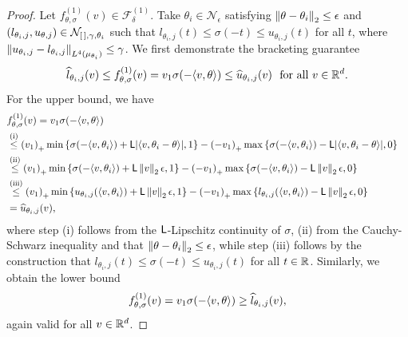 \begin{proof}
	Let $f_{\theta, \sigma}^{(1)}(v) \in \mathcal{F}_\delta^{(1)}$.
	Take $\theta_i \in \mathcal{N}_{\epsilon}$ satisfying
	$\left\|{\theta - \theta_i}\right\|_2 \leq \epsilon$ and
	$(l_{\theta_i, j}, u_{\theta,j}) \in \mathcal{N}_{[\,], \gamma, \theta_i}$
	such that $l_{\theta_i, j}(t) \leq  \sigma(-t) \leq u_{\theta_i, j}(t)$
	for all $t$, where $\left\|{u_{\theta_i,j} - l_{\theta_i,j}}\right\|_{L^4(\mu_{\theta_i})}
	\le \gamma$. We first demonstrate the bracketing guarantee
	\begin{align*}
		\widehat{l}_{\theta_i, j}(v)
		\leq f_{\theta, \sigma}^{(1)}(v) = v_1 \sigma(-\langle v, \theta\rangle)
		\leq \widehat{u}_{\theta_i, j}(v)
		~~ \mbox{for~all~} v \in \mathbb{R}^d.
	\end{align*}
	For the upper bound, we have
	\begin{align*}
		\lefteqn{f_{\theta, \sigma}^{(1)}(v) = v_1 \sigma(-\<v, \theta\>)}
		\\
		& \stackrel{\mathrm{(i)}}{\leq}
		\hinge{v_1} \min \left\{\sigma(-\<v, \theta_i\>) + \lipconst |\<v, \theta_i - \theta\>|, 1\right\}
		- \hinge{-v_1} \max \left\{\sigma(-\<v, \theta_i\>) - \lipconst |\<v, \theta_i - \theta\>|, 0\right\} \\
		& \stackrel{\mathrm{(ii)}}{\leq} \hinge{v_1}
		\min \left\{\sigma(-\<v, \theta_i\>) + \lipconst \ltwo{v} \epsilon, 1\right\}
		- \hinge{-v_1} \max \left\{\sigma(-\<v, \theta_i\>) - \lipconst \ltwo{v} \epsilon, 0\right\} \\
		& \stackrel{\mathrm{(iii)}}{\leq}
		\hinge{v_1} \min\left\{u_{\theta_i, j}(\<v, \theta_i\>) + \lipconst \ltwo{v} \epsilon, 1 \right\}
		- \hinge{-v_1} \max\left\{l_{\theta_i, j}(\<v, \theta_i\>) - \lipconst \ltwo{v} \epsilon, 0 \right\} \\
		& = \what{u}_{\theta_i, j}(v),
	\end{align*}
	where step (i) follows from the $\mathsf{L}$-Lipschitz continuity of
	$\sigma$, (ii) from the Cauchy-Schwarz inequality and
	that $\left\|{\theta - \theta_i}\right\|_2 \le \epsilon$,
	while step (iii) follows
	by the construction that
	$l_{\theta_i, j}(t) \leq \sigma(-t) \leq u_{\theta_i,
		j}(t)$ for all $t \in \mathbb{R}$.
	Similarly, we obtain the lower bound
	\begin{align*}
		f_{\theta, \sigma}^{(1)}(v) = v_1 \sigma(-\langle v, \theta\rangle) 
		\geq \widehat{l}_{\theta_i, j}(v),
	\end{align*}
	again valid for all $v \in \mathbb{R}^d$.
	

\end{proof}
